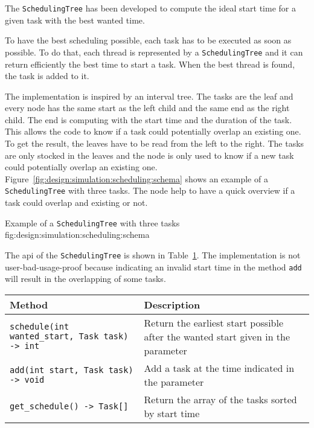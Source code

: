 The \texttt{SchedulingTree} has been developed to compute the ideal start time
for a given task with the best wanted time.

To have the best scheduling possible, each task has to be executed as soon as
possible.
To do that, each thread is represented by a \texttt{SchedulingTree} and it can
return efficiently the best time to start a task.
When the best thread is found, the task is added to it.

The implementation is inspired by an interval tree.
The tasks are the leaf and every node has the same start as the left child and
the same end as the right child.
The end is computing with the start time and the duration of the task.
This allows the code to know if a task could potentially overlap an existing one.
To get the result, the leaves have to be read from the left to the right.
The tasks are only stocked in the leaves and the node is only used to know if a
new task could potentially overlap an existing one.
Figure~\ref{fig:design:simulation:scheduling:schema} shows an example of a
\texttt{SchedulingTree} with three tasks.
The node help to have a quick overview if a task could overlap and existing or
not.

        {Example of a \texttt{SchedulingTree} with three tasks}
        {fig:design:simulation:scheduling:schema}

The \acrshort{api} of the \texttt{SchedulingTree} is shown in Table~\ref{tab:design:simulation:scheduling:api}.
The implementation is not user-bad-usage-proof because indicating an invalid
start time in the method \texttt{add} will result in the overlapping of some
tasks.

\begin{table}[ht]
    \centering
    \begin{tabular}{|m{}|m{}|}
        \hline
        \textbf{Method} & \textbf{Description} \\
        \hline
        \texttt{schedule(int wanted\_start, Task task) -> int} & Return the earliest start possible after the wanted start given in the parameter \\
        \hline
        \texttt{add(int start, Task task) -> void} & Add a task at the time indicated in the parameter \\
        \hline
        \texttt{get\_schedule() -> Task[]} & Return the array of the tasks sorted by start time \\
        \hline
    \end{tabular}
    \label{tab:design:simulation:scheduling:api}
\end{table}

